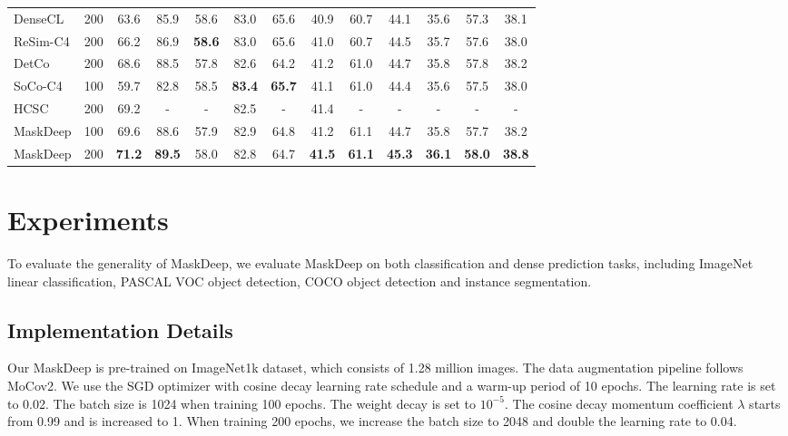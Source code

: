 \documentclass[10pt,twocolumn,letterpaper]{article}
\begin{document}
\begin{table*}[t]
{\begin{tabular}{lc|cc|ccc|ccc|ccc}
DenseCL &  200 & 63.6 & 85.9 & 58.6&83.0&65.6  &  40.9 &  60.7 &  44.1 & 35.6 & 57.3 &  38.1    \\ 
ReSim-C4 &  200 &66.2 & 86.9 &  \textbf{58.6} & 83.0 & 65.6 & 41.0 & 60.7 & 44.5 & 35.7 & 57.6 & 38.0   \\ 
DetCo   &  200 &  68.6 &  88.5 &  57.8     & 82.6  &  64.2 &  41.2  &  61.0 &  44.7  &  35.8  &  57.8 &  38.2  \\ 

SoCo-C4  & 100 &59.7  &82.8 & {58.5} & \textbf{83.4} & \textbf{65.7} & 41.1 &  61.0&  44.4     & 35.6  &  57.5& 38.0  \\ 
    
HCSC   & 200 &  69.2 & - & - & 82.5 & - & 41.4& - &  -  & -  & - & -  \\ 

MaskDeep & 100 & 69.6 & 88.6 & 57.9 &  82.9 &  64.8 & 41.2 & 61.1 & 44.7 & 35.8 & 57.7 & 38.2    \\
MaskDeep & 200 &  \textbf{71.2} & \textbf{89.5} & 58.0& 82.8 & 64.7 & \textbf{41.5}& \textbf{61.1} & \textbf{45.3} & \textbf{36.1} & \textbf{58.0} & \textbf{38.8}   \\ 

\bottomrule
\end{tabular}
}

\label{tab:main}
\end{table*}

\section{Experiments}

To evaluate the generality of  MaskDeep, we evaluate  MaskDeep on both classification and dense prediction tasks, including ImageNet linear classification\cite{deng2009imagenet}, PASCAL VOC object detection\cite{everingham2010pascal}, COCO object detection and instance segmentation\cite{lin2014microsoft}. 

\subsection{Implementation Details}
\label{sec:imp}
Our  MaskDeep is pre-trained on ImageNet1k dataset, which consists of 1.28 million images. The data augmentation pipeline follows MoCov2.  We use the SGD optimizer with cosine decay learning rate schedule\cite{loshchilov2016sgdr} and a warm-up period of 10 epochs. The learning rate is set to 0.02. The batch size is 1024 when training 100 epochs. The weight decay is set to $10^{-5}$. The cosine decay momentum coefficient $\lambda$ starts from 0.99 and is increased to 1. When training 200 epochs, we increase the batch size to 2048 and double the learning rate to 0.04. 
\end{document}
